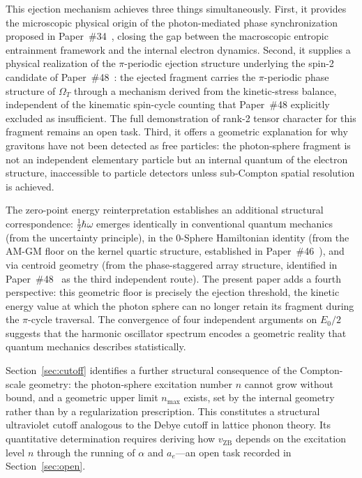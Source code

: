 \documentclass[%
 reprint, amsmath,amssymb, aps, prb, ]{revtex4-2}
\numberwithin{equation}{section}
\begin{document}
This ejection mechanism achieves three things simultaneously. First, it provides the microscopic physical origin of the photon-mediated phase synchronization proposed in Paper~\#34~\cite{hanamura34}, closing the gap between the macroscopic entropic entrainment framework and the internal electron dynamics. Second, it supplies a physical realization of the $\pi$-periodic ejection structure underlying the spin-2 candidate of Paper~\#48~\cite{hanamura48}: the ejected fragment carries the $\pi$-periodic phase structure of $\Omega_T$ through a mechanism derived from the kinetic-stress balance, independent of the kinematic spin-cycle counting that Paper~\#48 explicitly excluded as insufficient. The full demonstration of rank-2 tensor character for this fragment remains an open task. Third, it offers a geometric explanation for why gravitons have not been detected as free particles: the photon-sphere fragment is not an independent elementary particle but an internal quantum of the electron structure, inaccessible to particle detectors unless sub-Compton spatial resolution is achieved.

The zero-point energy reinterpretation establishes an additional structural correspondence: $\tfrac{1}{2}\hbar\omega$ emerges identically in conventional quantum mechanics (from the uncertainty principle), in the 0-Sphere Hamiltonian identity (from the AM-GM floor on the kernel quartic structure, established in Paper~\#46~\cite{hanamura46}), and via centroid geometry (from the phase-staggered array structure, identified in Paper~\#48~\cite{hanamura48} as the third independent route). The present paper adds a fourth perspective: this geometric floor is precisely the ejection threshold, the kinetic energy value at which the photon sphere can no longer retain its fragment during the $\pi$-cycle traversal. The convergence of four independent arguments on $E_0/2$ suggests that the harmonic oscillator spectrum encodes a geometric reality that quantum mechanics describes statistically.

Section~\ref{sec:cutoff} identifies a further structural consequence of the Compton-scale geometry: the photon-sphere excitation number $n$ cannot grow without bound, and a geometric upper limit $n_{\max}$ exists, set by the internal geometry rather than by a regularization prescription. This constitutes a structural ultraviolet cutoff analogous to the Debye cutoff in lattice phonon theory. Its quantitative determination requires deriving how $v_{\text{ZB}}$ depends on the excitation level $n$ through the running of $\alpha$ and $a_e$---an open task recorded in Section~\ref{sec:open}.
\end{document}
